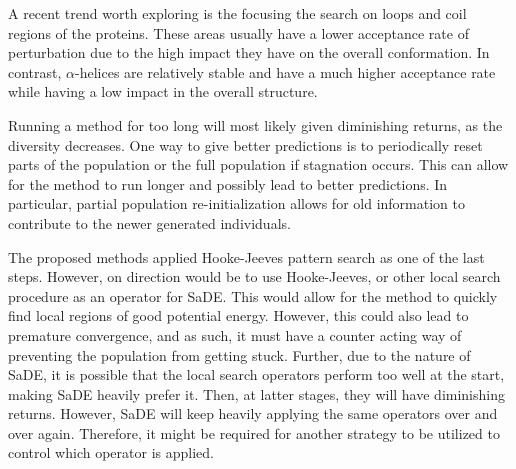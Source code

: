 A recent trend worth exploring is the focusing the search on loops and coil
regions of the proteins. These areas usually have a lower acceptance rate of
perturbation due to the high impact they have on the overall conformation.  In
contrast, $\alpha$-helices are relatively stable and have a much higher
acceptance rate while having a low impact in the overall structure.

Running a method for too long will most likely given diminishing returns, as
the diversity decreases. One way to give better predictions is to periodically
reset parts of the population or the full population if stagnation occurs. This
can allow for the method to run longer and possibly lead to better predictions.
In particular, partial population re-initialization allows for old information
to contribute to the newer generated individuals.

The proposed methods applied Hooke-Jeeves pattern search as one of the last steps.
However, on direction would be to use Hooke-Jeeves, or other local search
procedure as an operator for SaDE. This would allow for the method to quickly
find local regions of good potential energy. However, this could also lead to
premature convergence, and as such, it must have a counter acting way of
preventing the population from getting stuck. Further, due to the nature of
SaDE, it is possible that the local search operators perform too well at the
start, making SaDE heavily prefer it. Then, at latter stages, they will
have diminishing returns. However, SaDE will keep heavily applying the
same operators over and over again. Therefore, it might be required for another
strategy to be utilized to control which operator is applied.
